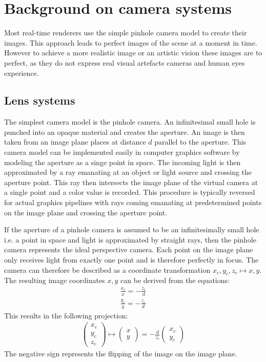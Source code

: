\chapter{Background on camera systems}
\label{ch:background}
Most real-time renderers use the simple pinhole camera model to create their images.
This approach leads to perfect images of the scene at a moment in time.
However to achieve a more realistic image or an artistic vision these images are to perfect, as they do not express real visual artefacts cameras and human eyes experience.
\section{Lens systems}
\label{ch:background-lens}
The simplest camera model is the pinhole camera.
An infinitesimal small hole is punched into an opaque material and creates the aperture.
An image is then taken from an image plane places at distance $d$ parallel to the aperture.
This camera model can be implemented easily in computer graphics software by modeling the aperture as a singe point in space.
The incoming light is then approximated by a ray emanating at an object or light source and crossing the aperture point.
This ray then intersects the image plane of the virtual camera at a single point and a color value is recorded.
This procedure is typically reversed for actual graphics pipelines with rays coming emanating at predetermined points on the image plane and crossing the aperture point.

If the aperture of a pinhole camera is assumed to be an infinitesimally small hole i.e. a point in space and light is approximated by straight rays, then the pinhole camera represents the ideal perspective camera.
Each point on the image plane only receives light from exactly one point and is therefore perfectly in focus.
The camera can therefore be described as a coordinate transformation $x_c, y_c, z_c \mapsto x, y$.
The resulting image coordinates $x, y$ can be derived from the equations:
\begin{align}
    \frac{x_c}{x} = -\frac{z_c}{d} \\
    \frac{y_c}{y} = -\frac{z_c}{d}
\end{align}
This results in the following projection:
\begin{align}
    \begin{pmatrix}
    x_c \\
    y_c \\
    z_c
\end{pmatrix} 
\mapsto
\begin{pmatrix}
    x \\
    y
\end{pmatrix}
= -\frac{d}{z_c}
\begin{pmatrix}
    x_c \\
    y_c
\end{pmatrix}
\end{align}
The negative sign represents the flipping of the image on the image plane. \cite{Beyerer.2016}

